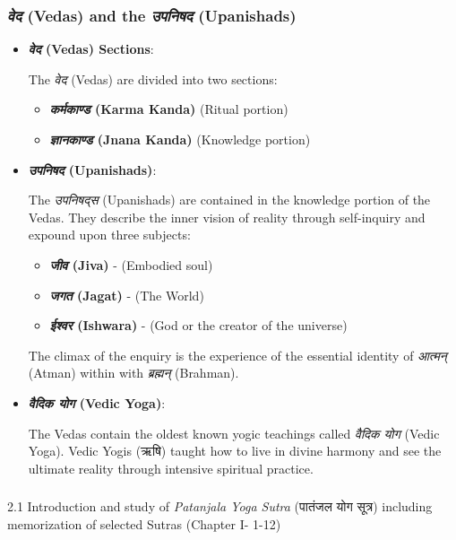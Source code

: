 \begin{frame}[fragile]\frametitle{\textit{वेद} (Vedas) and the \textit{उपनिषद} (Upanishads)}
      \begin{itemize}
        \item \textbf{\textit{वेद} (Vedas) Sections}: 
          
          The \textit{वेद} (Vedas) are divided into two sections:
          \begin{itemize}
            \item \textbf{\textit{कर्मकाण्ड} (Karma Kanda)} (Ritual portion)
            \item \textbf{\textit{ज्ञानकाण्ड} (Jnana Kanda)} (Knowledge portion)
          \end{itemize}
          
        \item \textbf{\textit{उपनिषद} (Upanishads)}: 
          
          The \textit{उपनिषद्स} (Upanishads) are contained in the knowledge portion of the Vedas. They describe the inner vision of reality through self-inquiry and expound upon three subjects:
          \begin{itemize}
            \item \textbf{\textit{जीव} (Jiva)} - (Embodied soul)
            \item \textbf{\textit{जगत} (Jagat)} - (The World)
            \item \textbf{\textit{ईश्वर} (Ishwara)} - (God or the creator of the universe)
          \end{itemize}
          The climax of the enquiry is the experience of the essential identity of \textit{आत्मन्} (Atman) within with \textit{ब्रह्मन्} (Brahman).
          
        \item \textbf{\textit{वैदिक योग} (Vedic Yoga)}: 
          
          The Vedas contain the oldest known yogic teachings called \textit{वैदिक योग} (Vedic Yoga). Vedic Yogis (ऋषि) taught how to live in divine harmony and see the ultimate reality through intensive spiritual practice.
          
      \end{itemize}
\end{frame}



\begin{frame}[fragile]\frametitle{}
\begin{center}
{\Large 2.1 Introduction and study of \textit{Patanjala Yoga Sutra} (पातंजल योग सूत्र) including memorization of selected Sutras (Chapter I- 1-12)}
\end{center}
\end{frame}

